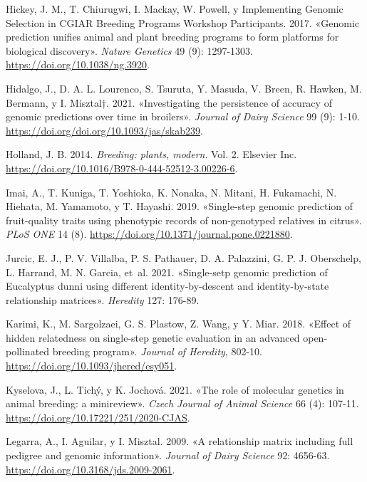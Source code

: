\documentclass[11pt,spanish,a4paper,oneside,]{book} %
\begin{document}
\leavevmode\hypertarget{ref-cite:44}{}%
Hickey, J. M., T. Chiurugwi, I. Mackay, W. Powell, y Implementing Genomic Selection in CGIAR Breeding Programs Workshop Participants. 2017. «Genomic prediction unifies animal and plant breeding programs to form platforms for biological discovery». \emph{Nature Genetics} 49 (9): 1297-1303. \url{https://doi.org/10.1038/ng.3920}.

\leavevmode\hypertarget{ref-cite:89}{}%
Hidalgo, J., D. A. L. Lourenco, S. Tsuruta, Y. Masuda, V. Breen, R. Hawken, M. Bermann, y I. Misztal†. 2021. «Investigating the persistence of accuracy of genomic predictions over time in broilers». \emph{Journal of Dairy Science} 99 (9): 1-10. \url{https://doi.org/doi.org/10.1093/jas/skab239}.

\leavevmode\hypertarget{ref-cite:43}{}%
Holland, J. B. 2014. \emph{Breeding: plants, modern}. Vol. 2. Elsevier Inc. \url{https://doi.org/10.1016/B978-0-444-52512-3.00226-6}.

\leavevmode\hypertarget{ref-cite:20}{}%
Imai, A., T. Kuniga, T. Yoshioka, K. Nonaka, N. Mitani, H. Fukamachi, N. Hiehata, M. Yamamoto, y T. Hayashi. 2019. «Single-step genomic prediction of fruit-quality traits using phenotypic records of non-genotyped relatives in citrus». \emph{PLoS ONE} 14 (8). \url{https://doi.org/10.1371/journal.pone.0221880}.

\leavevmode\hypertarget{ref-cite:11}{}%
Jurcic, E. J., P. V. Villalba, P. S. Pathauer, D. A. Palazzini, G. P. J. Oberschelp, L. Harrand, M. N. Garcia, et~al. 2021. «Single-setp genomic prediction of Eucalyptus dunni using different identity-by-descent and identity-by-state relationship matrices». \emph{Heredity} 127: 176-89.

\leavevmode\hypertarget{ref-cite:76}{}%
Karimi, K., M. Sargolzaei, G. S. Plastow, Z. Wang, y Y. Miar. 2018. «Effect of hidden relatedness on single-step genetic evaluation in an advanced open-pollinated breeding program». \emph{Journal of Heredity}, 802-10. \url{https://doi.org/10.1093/jhered/esy051}.

\leavevmode\hypertarget{ref-cite:32}{}%
Kyselova, J., L. Tichý, y K. Jochová. 2021. «The role of molecular genetics in animal breeding: a minireview». \emph{Czech Journal of Animal Science} 66 (4): 107-11. \url{https://doi.org/10.17221/251/2020-CJAS}.

\leavevmode\hypertarget{ref-cite:17}{}%
Legarra, A., I. Aguilar, y I. Misztal. 2009. «A relationship matrix including full pedigree and genomic information». \emph{Journal of Dairy Science} 92: 4656-63. \url{https://doi.org/10.3168/jds.2009-2061}.
\end{document}
